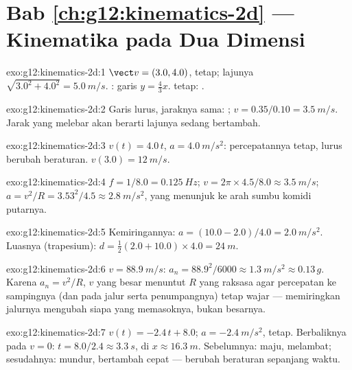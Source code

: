 \section*{Bab \ref{ch:g12:kinematics-2d} --- Kinematika pada Dua Dimensi}

\begin{solution}{exo:g12:kinematics-2d:1}
$\vect v = (3.0, 4.0)$, tetap; lajunya $\sqrt{3.0^2 + 4.0^2} =
\qty{5.0}{m/s}$. : garis $y = \tfrac43 x$.  tetap: .
\end{solution}

\begin{solution}{exo:g12:kinematics-2d:2}
Garis lurus, jaraknya sama: ;
$v = 0.35/0.10 = \qty{3.5}{m/s}$. Jarak yang melebar akan berarti
lajunya sedang bertambah.
\end{solution}

\begin{solution}{exo:g12:kinematics-2d:3}
$v(t) = 4.0\,t$, $a = \qty{4.0}{m/s^2}$: percepatannya tetap, lurus
berubah beraturan. $v(3.0) = \qty{12}{m/s}$.
\end{solution}

\begin{solution}{exo:g12:kinematics-2d:4}
$f = 1/8.0 = \qty{0.125}{Hz}$;
$v = 2\pi \times 4.5/8.0 \approx \qty{3.5}{m/s}$;
$a = v^2/R = 3.53^2/4.5 \approx \qty{2.8}{m/s^2}$, yang menunjuk ke arah
sumbu komidi putarnya.
\end{solution}

\begin{solution}{exo:g12:kinematics-2d:5}
Kemiringannya: $a = (10.0 - 2.0)/4.0 = \qty{2.0}{m/s^2}$. Luasnya
(trapesium): $d = \tfrac12 (2.0 + 10.0) \times 4.0 = \qty{24}{m}$.
\end{solution}

\begin{solution}{exo:g12:kinematics-2d:6}
$v = \qty{88.9}{m/s}$: $a_n = 88.9^2/6000 \approx \qty{1.3}{m/s^2}
\approx 0.13\,g$. Karena $a_n = v^2/R$, $v$ yang besar menuntut $R$ yang
raksasa agar percepatan ke sampingnya (dan  pada jalur serta
penumpangnya) tetap wajar --- memiringkan jalurnya mengubah siapa yang
memasoknya, bukan besarnya.
\end{solution}

\begin{solution}{exo:g12:kinematics-2d:7}
$v(t) = -2.4\,t + 8.0$; $a = \qty{-2.4}{m/s^2}$, tetap. Berbaliknya
pada $v = 0$: $t = 8.0/2.4 \approx \qty{3.3}{s}$, di
$x \approx \qty{16.3}{m}$. Sebelumnya: maju, melambat; sesudahnya:
mundur, bertambah cepat --- berubah beraturan sepanjang waktu.
\end{solution}

